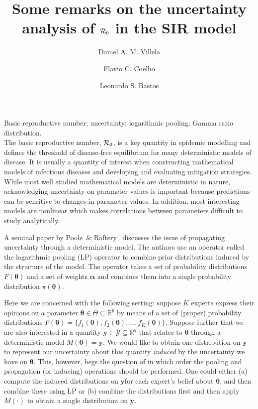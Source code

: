 \documentclass[11pt]{article}
\title{Some remarks on the uncertainty analysis of ${\cal R}_0$ in the SIR 
model}
\author[1]{Daniel A. M. Villela}
\author[2]{Flavio C. Coelho}
\author[1]{Leonardo S. Bastos}
\affil[2]{Institute of Evolutionary Biology, University of Edinburgh, United Kingdom} %
\affil[3]{School of Applied Mathematics, Getulio Vargas Foundation (FGV), Brazil,\,\emailaddress{fccoelho@fgv.br}} %
\date{\vspace{-6ex}} %
\newcommand{\keywords}[1]{\noindent{\large{\bf Keywords:}} #1\\}
\begin{document}
\maketitle

\keywords{Basic reproductive number; uncertainty; logarithmic pooling; Gamma ratio distribution.}

The basic reproductive number, ${\cal R}_0$, is a key quantity in epidemic 
modelling and defines the threshold of disease-free equilibrium for many 
deterministic models of disease.
It is usually a quantity of interest when constructing mathematical models of infectious diseases and developing and evaluating mitigation strategies.
While most well studied mathematical models are deterministic in nature, acknowledging uncertainty on parameter values is important because predictions can be sensitive to changes in parameter values.
In addition, most interesting models are nonlinear which makes correlations between parameters difficult to study analytically.

A seminal paper by Poole~\& Raftery~\cite{poole2000} discusses the issue of propagating uncertainty through a deterministic model.
The authors use an operator called the logarithmic pooling (LP) operator to combine prior distributions induced by the structure of the model.
The operator takes a set of probability distributions $F(\boldsymbol\theta)$ and a set of weights $\boldsymbol\alpha$ and combines them into a single probability distribution $\pi(\boldsymbol\theta)$.

Here we are concerned with the following setting: suppose $K$ experts express their opinions on a parameter $\boldsymbol\theta \in \Theta \subseteq \mathbb{R}^{p}$ by means of a set of (proper) probability distributions $F(\boldsymbol\theta) = \{ f_1(\boldsymbol\theta), f_2(\boldsymbol\theta), \ldots, f_K(\boldsymbol\theta) \}$.
Suppose further that we are also interested in a quantity $\mathbf{y} \in  
\mathcal{Y}  \subseteq \mathbb{R}^{q}$ that relates to $\boldsymbol\theta $ 
through a deterministic model $M(\boldsymbol\theta) = \mathbf{y}$.
We would like to obtain one distribution on $\mathbf{y}$ to represent our uncertainty about this quantity \textit{induced} by the uncertainty we have on $\boldsymbol\theta$.
This, however, begs the question of in which order the pooling and propagation (or inducing) operations should be performed.
One could either (a) compute the induced distributions  on $\mathbf{y}$for each 
expert's belief about $\boldsymbol\theta$, and then combine these using LP or 
(b) combine the distributions first and then apply $M(\cdot)$ to obtain a single
distribution on $\mathbf{y}$.
\end{document}
